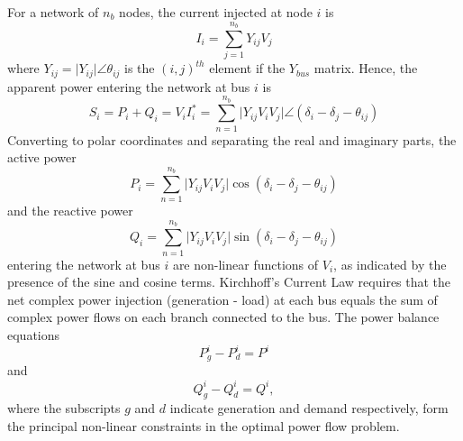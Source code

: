 For a network of $n_b$ nodes, the current injected at
node $i$ is
\begin{equation}
I_i = \sum_{j=1}^{n_b} Y_{ij} V_j
\end{equation}
where $Y_{ij} = \vert Y_{ij}\vert \angle\theta_{ij}$ is the $(i,j)^{th}$ element
if the $Y_{bus}$ matrix.  Hence, the apparent power entering
the network at bus $i$ is
\begin{equation}
S_i = P_i+Q_i = V_iI_i^* = \sum_{n=1}^{n_b} \vert Y_{ij}V_iV_j \vert \angle
(\delta_i - \delta_j - \theta_{ij})
\end{equation}
Converting to polar coordinates and separating the real and imaginary parts,
the active power
\begin{equation}
P_i = \sum_{n=1}^{n_b} \vert Y_{ij}V_iV_j \vert \cos(\delta_i - \delta_j -
\theta_{ij})
\end{equation}
and the reactive power
\begin{equation}
Q_i = \sum_{n=1}^{n_b} \vert Y_{ij}V_iV_j \vert \sin(\delta_i - \delta_j -
\theta_{ij})
\end{equation}
entering the network at bus $i$ are non-linear functions of $V_i$, as indicated
by the presence of the sine and cosine terms.  Kirchhoff's Current Law requires
that the net complex power injection (generation - load) at each bus equals the sum of
complex power flows on each branch connected to the bus.  The power balance
equations
\begin{equation}
\label{eq:p_balance}
P_g^i - P_d^i = P^i
\end{equation}
and
\begin{equation}
\label{eq:q_balance}
Q_g^i - Q_d^i = Q^i,
\end{equation}
where the subscripts $g$ and $d$ indicate generation and demand
respectively, form the principal non-linear constraints in the optimal power
flow problem.

